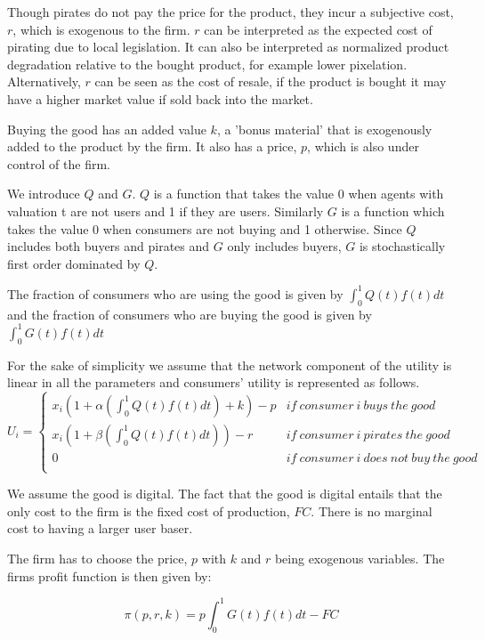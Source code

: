 Though pirates do not pay the price for the product, they incur a subjective cost, $r$, which is exogenous to the firm. $r$ can be interpreted as the expected cost of pirating due to local legislation. It can also be interpreted as normalized product degradation relative to the bought product, for example lower pixelation. Alternatively, $r$ can be seen as the cost of resale, if the product is bought it may have a higher market value if sold back into the market. 

Buying the good has an added value $k$, a 'bonus material' that is exogenously added to the product by the firm. It also has a price, $p$, which is also under control of the firm.

We introduce $Q$ and $G$. $Q$ is a function that takes the value 0 when agents with valuation t are not users and 1 if they are users. Similarly $G$ is a function which takes the value 0 when consumers are not buying and 1 otherwise. Since $Q$ includes both buyers and pirates and $G$ only includes buyers, $G$ is stochastically first order dominated by $Q$.

The fraction of consumers who are using the good is given by $ \int^{1}_{0}Q(t)f(t)dt$ and the fraction of consumers who are buying the good is given by $ \int^{1}_{0}G(t)f(t)dt$

For the sake of simplicity we assume that the network component of the utility is linear in all the parameters and consumers' utility is represented as follows. 
\[
U_i= \left\{
                \begin{array}{ll}
                  x_i(1+\alpha (\int^{1}_{0}Q(t)f(t)dt) +k ) -p  & if ~ consumer ~ i ~ buys ~ the ~  good  \\
                  x_i(1+\beta (\int^{1}_{0}Q(t)f(t)dt) ) -r &  if ~ consumer ~i ~ pirates ~ the ~  good \\
									0 &  if ~ consumer ~ i ~ does ~ not ~ buy ~ the ~ good   \\
                \end{array}
\right.
\]


We assume the good is digital. The fact that the good is digital entails that the only cost to the firm is the fixed cost of production, $FC$. There is no marginal cost to having a larger user baser. 

The firm has to choose the price,  $p$ with $k$ and $r$ being exogenous variables. The firms profit function is then given by:



\begin{equation} \label{eq:profit1}
\pi(p,r,k)
=p \int^{1}_{0}G(t)f(t)dt -FC
\end{equation}

